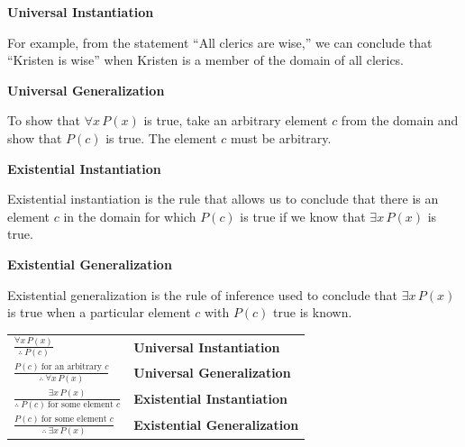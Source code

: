 \documentclass{article}
\begin{document}
\medskip

\textbf{Universal Instantiation}

\medskip

For example, from the statement ``All clerics are wise,'' we can conclude that ``Kristen is wise'' when Kristen is a member of the domain of all clerics.

\medskip

\textbf{Universal Generalization}

\medskip

To show that $\forall x\,P(x)$ is true, take an arbitrary element $c$ from the domain and show that $P(c)$ is true. The element $c$ must be arbitrary.

\medskip

\textbf{Existential Instantiation}

\medskip

Existential instantiation is the rule that allows us to conclude that there is an element $c$ in the domain for which $P(c)$ is true if we know that $\exists x\,P(x)$ is true.

\medskip

\textbf{Existential Generalization}

\medskip

Existential generalization is the rule of inference used to conclude that $\exists x\,P(x)$ is true when a particular element $c$ with $P(c)$ true is known.

\medskip

\begin{center}
\begin{tabular}{@{}p{}l@{}}
$\displaystyle \frac{\forall x\,P(x)}{\therefore\ P(c)}$ & \textbf{Universal Instantiation} \\[1.5em]
$\displaystyle \frac{P(c)\ \text{for an arbitrary }c}{\therefore\ \forall x\,P(x)}$ & \textbf{Universal Generalization} \\[1.5em]
$\displaystyle \frac{\exists x\,P(x)}{\therefore\ P(c)\ \text{for some element }c}$ & \textbf{Existential Instantiation} \\[1.5em]
$\displaystyle \frac{P(c)\ \text{for some element }c}{\therefore\ \exists x\,P(x)}$ & \textbf{Existential Generalization}
\end{tabular}
\end{center}
\end{document}
